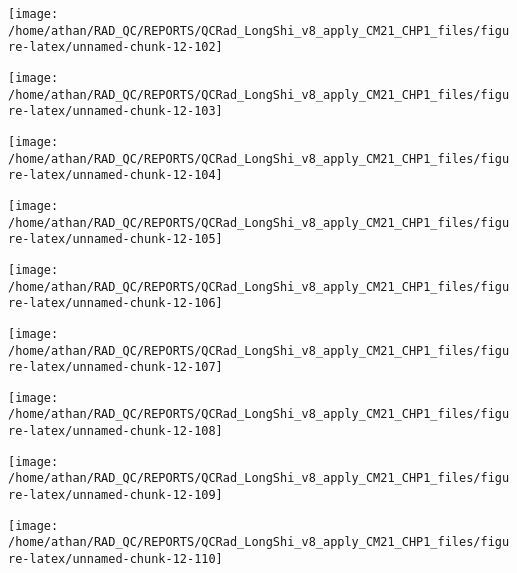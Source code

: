 \documentclass[
  10pt,
  a4paper,oneside]{article}
\begin{document}
\begin{center}\texttt{[image: /home/athan/RAD\_QC/REPORTS/QCRad\_LongShi\_v8\_apply\_CM21\_CHP1\_files/figure-latex/unnamed-chunk-12-102]} \end{center}

\begin{center}\texttt{[image: /home/athan/RAD\_QC/REPORTS/QCRad\_LongShi\_v8\_apply\_CM21\_CHP1\_files/figure-latex/unnamed-chunk-12-103]} \end{center}

\begin{center}\texttt{[image: /home/athan/RAD\_QC/REPORTS/QCRad\_LongShi\_v8\_apply\_CM21\_CHP1\_files/figure-latex/unnamed-chunk-12-104]} \end{center}

\begin{center}\texttt{[image: /home/athan/RAD\_QC/REPORTS/QCRad\_LongShi\_v8\_apply\_CM21\_CHP1\_files/figure-latex/unnamed-chunk-12-105]} \end{center}

\begin{center}\texttt{[image: /home/athan/RAD\_QC/REPORTS/QCRad\_LongShi\_v8\_apply\_CM21\_CHP1\_files/figure-latex/unnamed-chunk-12-106]} \end{center}

\begin{center}\texttt{[image: /home/athan/RAD\_QC/REPORTS/QCRad\_LongShi\_v8\_apply\_CM21\_CHP1\_files/figure-latex/unnamed-chunk-12-107]} \end{center}

\begin{center}\texttt{[image: /home/athan/RAD\_QC/REPORTS/QCRad\_LongShi\_v8\_apply\_CM21\_CHP1\_files/figure-latex/unnamed-chunk-12-108]} \end{center}

\begin{center}\texttt{[image: /home/athan/RAD\_QC/REPORTS/QCRad\_LongShi\_v8\_apply\_CM21\_CHP1\_files/figure-latex/unnamed-chunk-12-109]} \end{center}

\begin{center}\texttt{[image: /home/athan/RAD\_QC/REPORTS/QCRad\_LongShi\_v8\_apply\_CM21\_CHP1\_files/figure-latex/unnamed-chunk-12-110]} \end{center}
\end{document}
